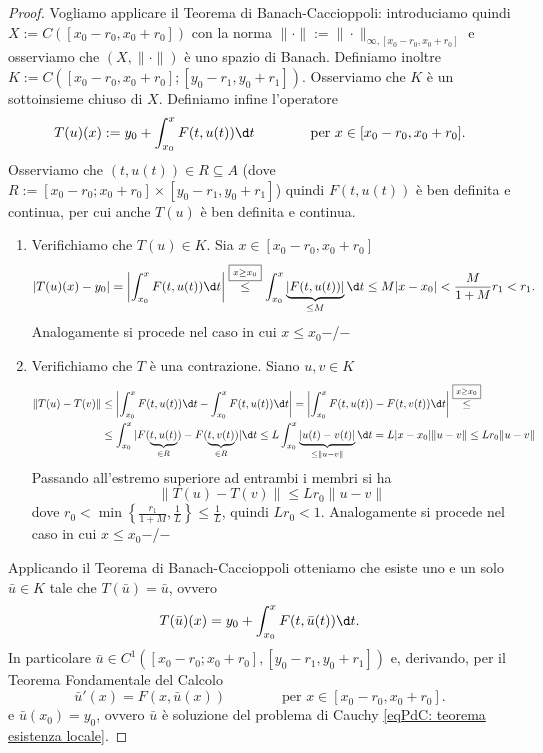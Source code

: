 \begin{proof}
    Vogliamo applicare il Teorema di Banach-Caccioppoli: introduciamo quindi $X:= C([x_{0}-r_{0}, x_{0}+r_{0}])$ con la norma $\|\cdot\|:=\|\cdot\|_{\infty, [x_0-r_0,x_0+r_0]}$ e osserviamo che $(X, \|\cdot\|)$ è uno spazio di Banach. Definiamo inoltre $K:=C([x_{0}-r_{0}, x_{0}+r_{0}] ; [y_0-r_1, y_0+r_1])$. Osserviamo che $K$ è un sottoinsieme chiuso di $X$. Definiamo infine l'operatore 
    \[T(u)(x) := y_0+\int_{x_0}^xF(t,u(t))\d t\qquad \qquad\text{per }x\in [x_0-r_0, x_0+r_0].\]
    Osserviamo che $(t,u(t))\in R\subseteq A$ (dove $R:=\left[x_{0}-r_{0}; x_{0}+r_{0}\right]\times\left[y_{0}-r_{1}, y_{0}+r_{1}\right]$) quindi $F(t,u(t))$ è ben definita e continua, per cui anche $T(u)$ è ben definita e continua.
    \begin{enumerate}
        \item Verifichiamo che $T(u)\in K$. Sia $x\in [x_0-r_0, x_0+r_0]$
        \[|T(u)(x)-y_0| = \left|\int_{x_0}^xF(t,u(t))\d t\right| \overset{\boxed{\scriptstyle x\geq x_0}}{\leq} \int_{x_0}^x \underbrace{|F(t,u(t))|}_{\leq M}\d t \leq M|x-x_0| < \frac{M}{1+M}r_1<r_1.\]
        Analogamente si procede nel caso in cui $x\leq x_0$\hspace{\fill}$-$/$-$
        \item Verifichiamo che $T$ è una contrazione. Siano $u, v\in K$ 
        \begin{align*}\|T(u)-T(v)\|&\leq \left|\int_{x_0}^xF(t,u(t))\d t - \int_{x_0}^xF(t,u(t))\d t\right| = \left|\int_{x_0}^xF(t,u(t))-F(t,v(t))\d t\right|\overset{\boxed{\scriptstyle x\geq x_0}}{\leq}\\ &\leq \int_{x_0}^x|F(\underbrace{t,u(t)}_{\in R})- F(\underbrace{t,v(t)}_{\in R})|\d t \leq L \int_{x_0}^x \underbrace{|u(t)-v(t)|}_{\leq \|u-v\|}\d t = L|x-x_0|\|u-v\|\leq Lr_0\|u-v\|\end{align*}
        Passando all'estremo superiore ad entrambi i membri si ha 
        \[\|T(u)-T(v)\|\leq Lr_0\|u-v\|\]
        dove $r_{0}<\min \left\{\frac{r_{1}}{1+M}, \frac{1}{L}\right\}\leq \frac{1}{L}$, quindi $Lr_0<1$. Analogamente si procede nel caso in cui $x\leq x_0$\hspace{\fill}$-$/$-$
    \end{enumerate}
    Applicando il Teorema di Banach-Caccioppoli otteniamo che esiste uno e un solo $\bar{u}\in K$ tale che $T(\bar{u})=\bar{u}$, ovvero 
    \[T(\bar{u})(x) = y_0+\int_{x_0}^xF(t,\bar u(t)) \d t.\]
    In particolare $\bar u \in C^{1}\left(\left[x_{0}-r_{0}; x_{0}+r_{0}\right],\left[y_{0}-r_{1}, y_{0}+r_{1}\right]\right)$ e, derivando, per il Teorema Fondamentale del Calcolo
    \[\bar u'(x) = F(x,\bar u(x)) \qquad \qquad\text{per }x\in [x_0-r_0, x_0+r_0].\]
    e $\bar u(x_0)=y_0$, ovvero $\bar u$ è soluzione del problema di Cauchy \eqref{eqPdC: teorema esistenza locale}.
\end{proof}
